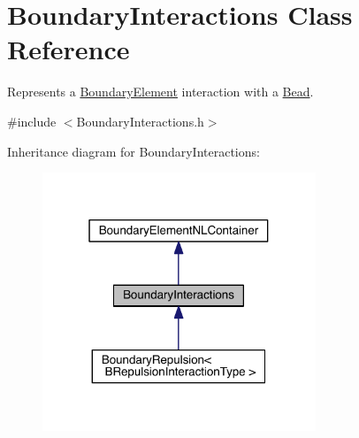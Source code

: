 \hypertarget{classBoundaryInteractions}{\section{Boundary\+Interactions Class Reference}
\label{classBoundaryInteractions}
}


Represents a \hyperlink{classBoundaryElement}{Boundary\+Element} interaction with a \hyperlink{classBead}{Bead}.  




{\ttfamily \#include $<$Boundary\+Interactions.\+h$>$}



Inheritance diagram for Boundary\+Interactions\+:\nopagebreak
\begin{figure}[H]
\begin{center}
\leavevmode
\includegraphics[width=232pt]{classBoundaryInteractions__inherit__graph}
\end{center}
\end{figure}


